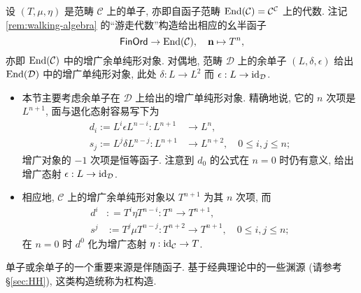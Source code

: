 \begin{example}\label{eg:monad-simplicial}
	设 $(T, \mu, \eta)$ 是范畴 $\mathcal{C}$ 上的单子, 亦即自函子范畴 $\operatorname{End}(\mathcal{C}) = \mathcal{C}^{\mathcal{C}}$ 上的代数. 注记 \ref{rem:walking-algebra} 的``游走代数''构造给出相应的幺半函子
	\[ \mathsf{FinOrd} \to \operatorname{End}(\mathcal{C}), \quad \mathbf{n} \mapsto T^n , \]
	亦即 $\operatorname{End}(\mathcal{C})$ 中的增广余单纯形对象. 对偶地, 范畴 $\mathcal{D}$ 上的余单子 $(L, \delta, \epsilon)$ 给出 $\operatorname{End}(\mathcal{D})$ 中的增广单纯形对象, 此处 $\delta: L \to L^2$ 而 $\epsilon: L \to \mathrm{id}_{\mathcal{D}}$.
	
	\begin{itemize}
		\item 本节主要考虑余单子在 $\mathcal{D}$ 上给出的增广单纯形对象. 精确地说, 它的 $n$ 次项是 $L^{n+1}$, 面与退化态射容易写下为
		\begin{align*}
			d_i := L^i \epsilon L^{n-i}: L^{n+1} & \to L^n, \\
			s_j := L^j \delta L^{n-j}: L^{n+1} & \to L^{n+2}, \quad 0 \leq i, j \leq n ;
		\end{align*}
		增广对象的 $-1$ 次项是恒等函子. 注意到 $d_0$ 的公式在 $n=0$ 时仍有意义, 给出增广态射 $\epsilon: L \to \mathrm{id}_{\mathcal{D}}$.
	
		\item 相应地, $\mathcal{C}$ 上的增广余单纯形对象以 $T^{n+1}$ 为其 $n$ 次项, 而
		\begin{align*}
			d^i & : = T^i \eta T^{n-i}: T^n \to T^{n+1}, \\
			s^j & := T^j \mu T^{n-j}: T^{n+2} \to T^{n+1}, \quad 0 \leq i, j \leq n ;
		\end{align*}
		在 $n=0$ 时 $d^0$ 化为增广态射 $\eta: \mathrm{id}_{\mathcal{C}} \to T$.
	\end{itemize}
\end{example}

单子或余单子的一个重要来源是伴随函子. 基于经典理论中的一些渊源 (请参考 \S\ref{sec:HH}), 这类构造统称为杠构造.

